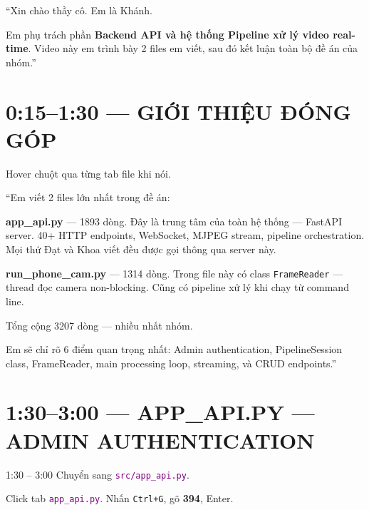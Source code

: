 \documentclass[12pt, a4paper]{article}
\newcommand{\fpath}[1]{\texttt{\textcolor{purple}{#1}}}
\begin{document}
\begin{say}
``Xin chào thầy cô. Em là Khánh.

Em phụ trách phần \textbf{Backend API và hệ thống Pipeline xử lý video real-time}.
Video này em trình bày 2 files em viết,
sau đó kết luận toàn bộ đề án của nhóm.''
\end{say}

\section{0:15--1:30 --- GIỚI THIỆU ĐÓNG GÓP}

\begin{doact}
Hover chuột qua từng tab file khi nói.
\end{doact}

\begin{say}
``Em viết 2 files lớn nhất trong đề án:

\textbf{app\_api.py} --- 1893 dòng.
Đây là trung tâm của toàn hệ thống --- FastAPI server.
40+ HTTP endpoints, WebSocket, MJPEG stream, pipeline orchestration.
Mọi thứ Đạt và Khoa viết đều được gọi thông qua server này.

\textbf{run\_phone\_cam.py} --- 1314 dòng.
Trong file này có class \texttt{FrameReader} --- thread đọc camera non-blocking.
Cũng có pipeline xử lý khi chạy từ command line.

Tổng cộng 3207 dòng --- nhiều nhất nhóm.

Em sẽ chỉ rõ 6 điểm quan trọng nhất:
Admin authentication, PipelineSession class, FrameReader,
main processing loop, streaming, và CRUD endpoints.''
\end{say}

\section{1:30--3:00 --- APP\_API.PY --- ADMIN AUTHENTICATION}

\begin{timing}{1:30 -- 3:00}
Chuyển sang \fpath{src/app\_api.py}.
\end{timing}

\begin{doact}
Click tab \fpath{app\_api.py}.
Nhấn \texttt{Ctrl+G}, gõ \textbf{394}, Enter.
\end{doact}
\end{document}
